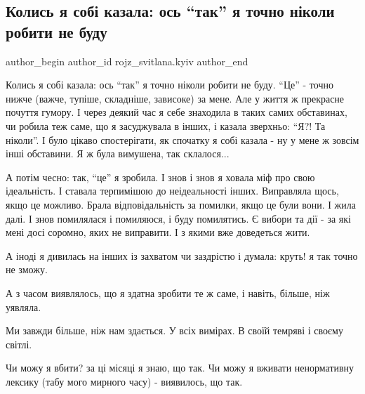  
 
 
 
 

\subsection{Колись я собі казала: ось \enquote{так} я точно ніколи робити не буду}
\label{sec:05_01_2023.fb.rojz_svitlana.kyiv.1.kolis_ya_sob__kazala}

\ifcmt
 author_begin
   author_id rojz_svitlana.kyiv
 author_end
\fi

Колись я собі казала: ось \enquote{так} я точно ніколи робити не буду. \enquote{Це} - точно
нижче (важче, тупіше, складніше, зависоке) за мене. Але у життя ж прекрасне
почуття гумору. І через деякий час я себе знаходила в таких самих обставинах,
чи робила теж саме, що я засуджувала в інших, і казала зверхньо: \enquote{Я?! Та
ніколи}. І було цікаво спостерігати, як спочатку я собі казала - ну у мене ж
зовсім інші обставини. Я ж була вимушена, так склалося...  

А потім чесно: так, \enquote{це} я зробила. І знов і знов я ховала міф про свою
ідеальність. І ставала терпимішою до неідеальності інших. Виправляла щось, якщо
це можливо. Брала відповідальність за помилки, якщо це були вони. І жила далі.
І знов помилялася і помиляюся, і буду помилятись. Є вибори та дії - за які мені
досі соромно, яких не виправити. І з якими вже доведеться жити. 

А іноді я дивилась на інших із захватом чи заздрістю і думала: круть! я так
точно не зможу. 

А з часом виявлялось, що я здатна зробити те ж саме, і навіть, більше, ніж
уявляла. 

Ми завжди більше, ніж нам здається. У всіх вимірах. В своїй темряві і своєму
світлі. 

Чи можу я вбити? за ці місяці я знаю, що так. Чи можу я вживати ненормативну
лексику (табу мого мирного часу) - виявилось, що так. 

